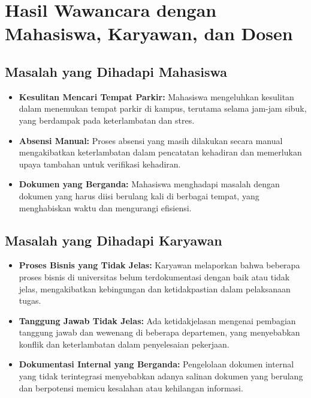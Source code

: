 \section{Hasil Wawancara dengan Mahasiswa, Karyawan, dan Dosen}

\subsection{Masalah yang Dihadapi Mahasiswa}
\begin{itemize}
	\item \textbf{Kesulitan Mencari Tempat Parkir:} Mahasiswa mengeluhkan kesulitan dalam menemukan tempat parkir di kampus, terutama selama jam-jam sibuk, yang berdampak pada keterlambatan dan stres.
	\item \textbf{Absensi Manual:} Proses absensi yang masih dilakukan secara manual mengakibatkan keterlambatan dalam pencatatan kehadiran dan memerlukan upaya tambahan untuk verifikasi kehadiran.
	\item \textbf{Dokumen yang Berganda:} Mahasiswa menghadapi masalah dengan dokumen yang harus diisi berulang kali di berbagai tempat, yang menghabiskan waktu dan mengurangi efisiensi.
\end{itemize}

\subsection{Masalah yang Dihadapi Karyawan}
\begin{itemize}
	\item \textbf{Proses Bisnis yang Tidak Jelas:} Karyawan melaporkan bahwa beberapa proses bisnis di universitas belum terdokumentasi dengan baik atau tidak jelas, mengakibatkan kebingungan dan ketidakpastian dalam pelaksanaan tugas.
	\item \textbf{Tanggung Jawab Tidak Jelas:} Ada ketidakjelasan mengenai pembagian tanggung jawab dan wewenang di beberapa departemen, yang menyebabkan konflik dan keterlambatan dalam penyelesaian pekerjaan.
	\item \textbf{Dokumentasi Internal yang Berganda:} Pengelolaan dokumen internal yang tidak terintegrasi menyebabkan adanya salinan dokumen yang berulang dan berpotensi memicu kesalahan atau kehilangan informasi.
\end{itemize}

